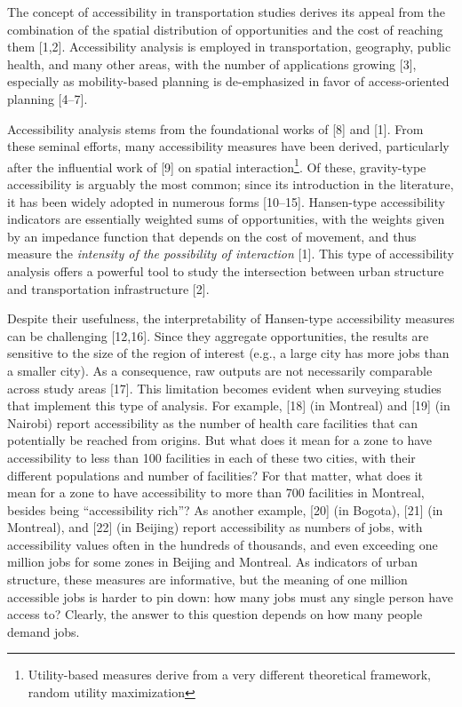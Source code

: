 \documentclass[10pt,letterpaper]{article}
\begin{document}
The concept of accessibility in transportation studies derives its
appeal from the combination of the spatial distribution of opportunities
and the cost of reaching them {[}1,2{]}. Accessibility analysis is
employed in transportation, geography, public health, and many other
areas, with the number of applications growing {[}3{]}, especially as
mobility-based planning is de-emphasized in favor of access-oriented
planning {[}4--7{]}.

Accessibility analysis stems from the foundational works of {[}8{]} and
{[}1{]}. From these seminal efforts, many accessibility measures have
been derived, particularly after the influential work of {[}9{]} on
spatial interaction\footnote{Utility-based measures derive from a very
  different theoretical framework, random utility maximization}. Of
these, gravity-type accessibility is arguably the most common; since its
introduction in the literature, it has been widely adopted in numerous
forms {[}10--15{]}. Hansen-type accessibility indicators are essentially
weighted sums of opportunities, with the weights given by an impedance
function that depends on the cost of movement, and thus measure the
\emph{intensity of the possibility of interaction} {[}1{]}. This type of
accessibility analysis offers a powerful tool to study the intersection
between urban structure and transportation infrastructure {[}2{]}.

Despite their usefulness, the interpretability of Hansen-type
accessibility measures can be challenging {[}12,16{]}. Since they
aggregate opportunities, the results are sensitive to the size of the
region of interest (e.g., a large city has more jobs than a smaller
city). As a consequence, raw outputs are not necessarily comparable
across study areas {[}17{]}. This limitation becomes evident when
surveying studies that implement this type of analysis. For example,
{[}18{]} (in Montreal) and {[}19{]} (in Nairobi) report accessibility as
the number of health care facilities that can potentially be reached
from origins. But what does it mean for a zone to have accessibility to
less than 100 facilities in each of these two cities, with their
different populations and number of facilities? For that matter, what
does it mean for a zone to have accessibility to more than 700
facilities in Montreal, besides being ``accessibility rich''? As another
example, {[}20{]} (in Bogota), {[}21{]} (in Montreal), and {[}22{]} (in
Beijing) report accessibility as numbers of jobs, with accessibility
values often in the hundreds of thousands, and even exceeding one
million jobs for some zones in Beijing and Montreal. As indicators of
urban structure, these measures are informative, but the meaning of one
million accessible jobs is harder to pin down: how many jobs must any
single person have access to? Clearly, the answer to this question
depends on how many people demand jobs.
\end{document}

